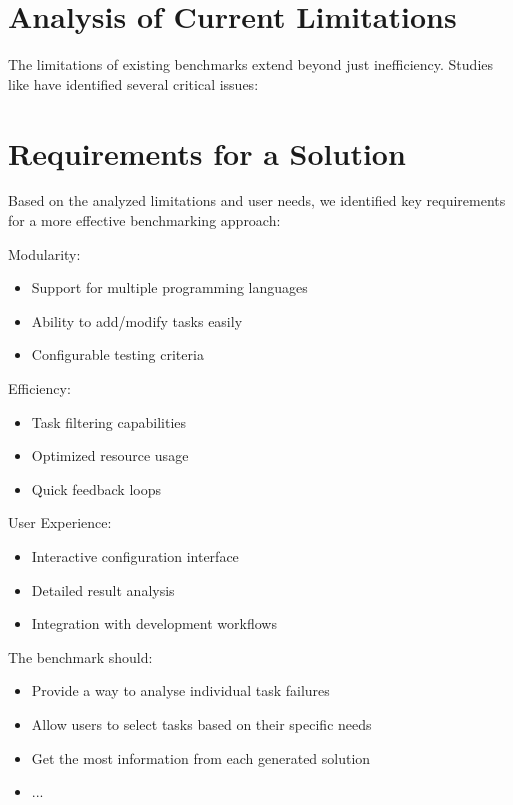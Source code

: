 \section{Analysis of Current Limitations}

The limitations of existing benchmarks extend beyond just inefficiency. Studies like  have identified several critical issues:




\section{Requirements for a Solution}

Based on the analyzed limitations and user needs, we identified key requirements for a more effective benchmarking approach:

Modularity:
\begin{itemize}
    \item Support for multiple programming languages
    \item Ability to add/modify tasks easily
    \item Configurable testing criteria
\end{itemize}

Efficiency:
\begin{itemize}
    \item Task filtering capabilities
    \item Optimized resource usage
    \item Quick feedback loops
\end{itemize}

User Experience:
\begin{itemize}
    \item Interactive configuration interface
    \item Detailed result analysis
    \item Integration with development workflows
\end{itemize}

The benchmark should:
\begin{itemize}
    \item Provide a way to analyse individual task failures
    \item Allow users to select tasks based on their specific needs
    \item Get the most information from each generated solution
    \item ...
\end{itemize}

